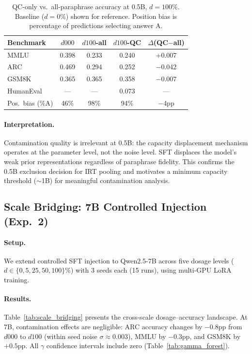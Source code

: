 \documentclass[11pt,a4paper]{article}
\newcommand{\gam}{\gamma}
\begin{document}
\begin{table}[t]
\centering
\small
\caption{QC-only vs.\ all-paraphrase accuracy at 0.5B, $d = 100\%$. Baseline ($d = 0\%$) shown for reference. Position bias is percentage of predictions selecting answer A.}
\label{tab:qc_ablation}
\begin{tabular}{lcccc}
\toprule
\textbf{Benchmark} & $d000$ & $d100$-all & $d100$-QC & $\Delta$(QC$-$all) \\
\midrule
MMLU       & 0.398 & 0.233 & 0.240 & +0.007 \\
ARC        & 0.469 & 0.294 & 0.252 & $-$0.042 \\
GSM8K      & 0.365 & 0.365 & 0.358 & $-$0.007 \\
HumanEval  & ---   & ---   & 0.073 & --- \\
\midrule
Pos.\ bias (\%A) & 46\% & 98\% & 94\% & $-$4pp \\
\bottomrule
\end{tabular}
\end{table}

\paragraph{Interpretation.}
Contamination quality is irrelevant at 0.5B: the capacity displacement mechanism operates at the parameter level, not the noise level.
SFT displaces the model's weak prior representations regardless of paraphrase fidelity.
This confirms the 0.5B exclusion decision for IRT pooling and motivates a minimum capacity threshold ($\sim$1B) for meaningful contamination analysis.

\subsection{Scale Bridging: 7B Controlled Injection (Exp.~2)}
\label{sec:exp_7b}

\paragraph{Setup.}
We extend controlled SFT injection to Qwen2.5-7B across five dosage levels ($d \in \{0, 5, 25, 50, 100\}\%$) with 3 seeds each (15 runs), using multi-GPU LoRA training.

\paragraph{Results.}
Table~\ref{tab:scale_bridging} presents the cross-scale dosage--accuracy landscape.
At 7B, contamination effects are negligible: ARC accuracy changes by $-0.8$pp from $d000$ to $d100$ (within seed noise $\sigma \approx 0.003$), MMLU by $-0.3$pp, and GSM8K by $+0.5$pp.
All $\gam$ confidence intervals include zero (Table~\ref{tab:gamma_forest}).
\end{document}
